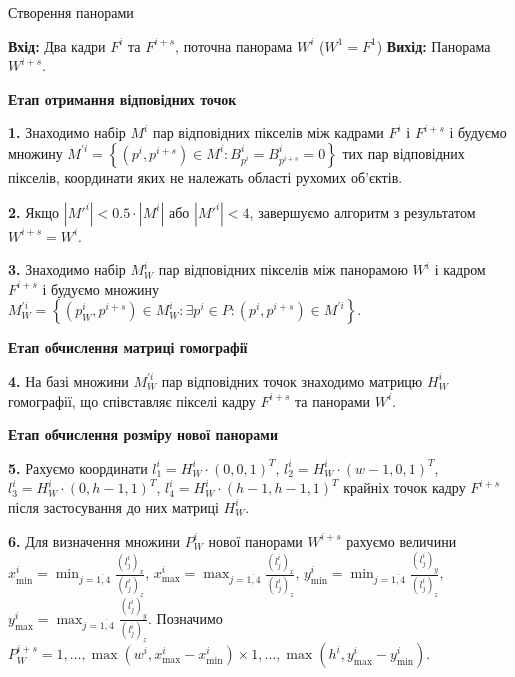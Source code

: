 \begin{algorithm}[H]
    \caption{Створення панорами}
    \begin{algorithmic}
        \State \textbf{Вхід:} Два кадри \(F^{i}\) та \(F^{i + s}\), поточна панорама \(W^{i}\) (\(W^{1} = F^{1}\))
        \State \textbf{Вихід:} Панорама \(W^{i + s}\).

        \textbf{Етап отримання відповідних точок}

        \textbf{1.} Знаходимо набір \(M^{i}\) пар відповідних пікселів між кадрами
        \(F^{i}\) і \(F^{i + s}\) і будуємо множину
        \(M^{'i} = \left\{ \left( p^{i},p^{i + s} \right) \in M^{i}:B_{p^{i}}^{i} = B_{p^{i + s}}^{i} = 0 \right\}\)
        тих пар відповідних пікселів, координати яких не належать області
        рухомих об'єктів.

        \textbf{2.}
        Якщо \(\left| {M'}^{i} \right| < 0.5 \cdot \left| M^{i} \right|\) або
        \(\left| {M'}^{i} \right| < 4\), завершуємо алгоритм з результатом
        \(W^{i + s} = W^{i}\).

        \textbf{3.}
        Знаходимо набір \(M_{W}^{i}\) пар відповідних пікселів між панорамою
        \(W^{i}\) і кадром \(F^{i + s}\) і будуємо множину
        \(M_{W}^{'i} = \left\{ \left( p_{W}^{i},p^{i + s} \right) \in M_{W}^{i}:\exists p^{i} \in P:\left( p^{i},p^{i + s} \right) \in M^{'i} \right\}\).
        
        \textbf{Етап обчислення матриці гомографії}

        \textbf{4.}
        На базі множини \(M_{W}^{'i}\) пар відповідних точок знаходимо матрицю
        \(H_{W}^{i}\) гомографії, що співставляє пікселі кадру \(F^{i + s}\)
        та панорами \(W^{i}\).

        \textbf{Етап обчислення розміру нової панорами}

        \textbf{5.}
        Рахуємо координати
        \(l_{1}^{i} = H_{W}^{i} \cdot (0,0,1)^{T}\),
        \(l_{2}^{i} = H_{W}^{i} \cdot (w - 1,0,1)^{T}\),
        \(l_{3}^{i} = H_{W}^{i} \cdot (0,h - 1,1)^{T}\),
        \(l_{4}^{i} = H_{W}^{i} \cdot (h - 1,h - 1,1)^{T}\) крайніх
        точок кадру \(F^{i + s}\) після застосування до них матриці
        \(H_{W}^{i}\).

        \textbf{6.}
        Для визначення множини \(P_{W}^{i}\) нової панорами \(W^{i + s}\)
        рахуємо величини
        \(x_{\min}^{i} = \min_{j = \overline{1,4}}\frac{( l_{j}^{i} )_{x}}{( l_{j}^{i} )_{z}}\),
        \(x_{\max}^{i} = \max_{j = \overline{1,4}}\frac{( l_{j}^{i} )_{x}}{( l_{j}^{i} )_{z}}\),
        \(y_{\min}^{i} = \min_{j = \overline{1,4}}\frac{( l_{j}^{i} )_{y}}{( l_{j}^{i} )_{z}}\),
        \(y_{\max}^{i} = \max_{j = \overline{1,4}}\frac{( l_{j}^{i} )_{y}}{( l_{j}^{i} )_{z}}\).
        Позначимо
        $P_{W}^{i + s} = 
        { 1,\ldots,\max( w^{i},x_{\max}^{i} - x_{\min}^{i} ) }
        \times 
        { 1,\ldots,\max( h^{i},y_{\max}^{i} - y_{\min}^{i} ) }$.


\end{algorithmic}
\end{algorithm}

